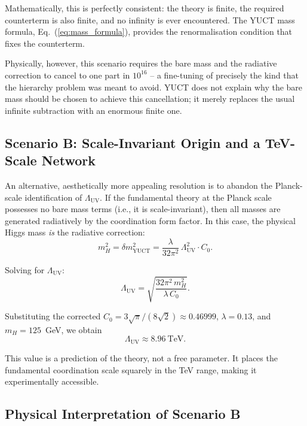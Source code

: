 \documentclass[12pt,a4paper]{article}
\newcommand{\LUV}{\Lambda_{\mathrm{UV}}}
\theoremstyle{remark}
\begin{document}
	Mathematically, this is perfectly consistent: the theory is finite, the required counterterm is also finite, and no infinity is ever encountered.  The YUCT mass formula, Eq.~(\ref{eq:mass_formula}), provides the renormalisation condition that fixes the counterterm.
	
	Physically, however, this scenario requires the bare mass and the radiative correction to cancel to one part in \(10^{16}\) -- a fine-tuning of precisely the kind that the hierarchy problem was meant to avoid.  YUCT does not explain why the bare mass should be chosen to achieve this cancellation; it merely replaces the usual infinite subtraction with an enormous finite one.
	
	\subsection{Scenario B: Scale-Invariant Origin and a TeV-Scale Network}
	
	An alternative, aesthetically more appealing resolution is to abandon the Planck-scale identification of \(\LUV\).  If the fundamental theory at the Planck scale possesses no bare mass terms (i.e., it is scale-invariant), then all masses are generated radiatively by the coordination form factor.  In this case, the physical Higgs mass \emph{is} the radiative correction:
	\begin{equation}
		m_H^2 = \delta m^2_{\mathrm{YUCT}} = \frac{\lambda}{32\pi^2}\,\LUV^2 \cdot C_0.
		\label{eq:scale_inv}
	\end{equation}
	
	Solving for \(\LUV\):
	\begin{equation}
		\LUV = \sqrt{\frac{32\pi^2\, m_H^2}{\lambda\, C_0}}.
		\label{eq:LUV_solve}
	\end{equation}
	
	Substituting the corrected \(C_0 = 3\sqrt{\pi}/(8\sqrt{2}) \approx 0.46999\), \(\lambda = 0.13\), and \(m_H = 125\)~GeV, we obtain
	\begin{equation}
		\boxed{\LUV \approx 8.96\ \mathrm{TeV}}.
		\label{eq:LUV_TeV}
	\end{equation}
	
	This value is a prediction of the theory, not a free parameter.  It places the fundamental coordination scale squarely in the TeV range, making it experimentally accessible.
	
	\subsection{Physical Interpretation of Scenario B}
	
\end{document}
